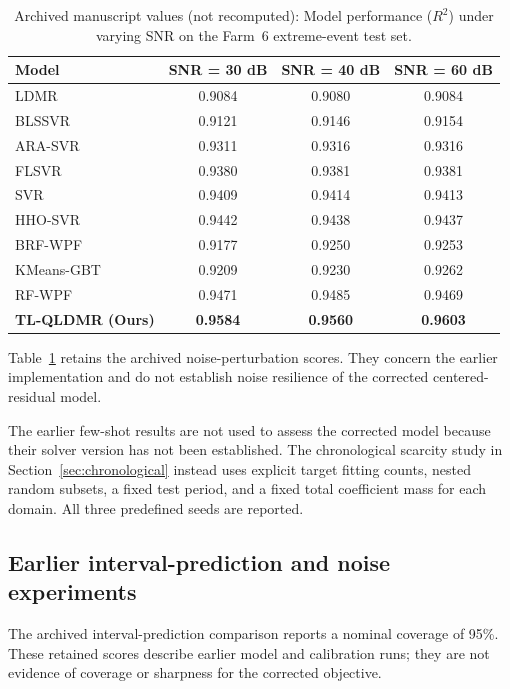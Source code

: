 \begin{table}[ht]
\centering
\caption{{\color{blue}Archived manuscript values (not recomputed): }Model performance ($R^2$) under varying SNR on the Farm~6 extreme-event test set.}
\setlength{\tabcolsep}{3.5mm}
\begin{tabular}{lccc}
\toprule
Model & SNR = 30 dB & SNR = 40 dB & SNR = 60 dB \\
\midrule
LDMR & 0.9084 & 0.9080 & 0.9084 \\
BLSSVR        & 0.9121 & 0.9146 & 0.9154 \\
ARA-SVR       & 0.9311 & 0.9316 & 0.9316 \\
FLSVR         & 0.9380 & 0.9381 & 0.9381 \\
SVR  & 0.9409 & 0.9414 & 0.9413 \\
HHO-SVR       & 0.9442 & 0.9438 & 0.9437 \\
BRF-WPF       & 0.9177 & 0.9250 & 0.9253 \\
KMeans-GBT    & 0.9209 & 0.9230 & 0.9262 \\
RF-WPF        & 0.9471 & 0.9485 & 0.9469 \\
\textbf{TL-QLDMR (Ours)} & \textbf{0.9584} & \textbf{0.9560} & \textbf{0.9603} \\
\bottomrule
\end{tabular}
\label{tab:exp2_noise}
\end{table}

{\color{blue}Table~\ref{tab:exp2_noise} retains the archived noise-perturbation scores. They concern the earlier implementation and do not establish noise resilience of the corrected centered-residual model.}

{\color{blue}The earlier few-shot results are not used to assess the corrected model because their solver version has not been established. The chronological scarcity study in Section~\ref{sec:chronological} instead uses explicit target fitting counts, nested random subsets, a fixed test period, and a fixed total coefficient mass for each domain. All three predefined seeds are reported.}

\subsection{Earlier interval-prediction and noise experiments}\label{sec:exp3}

{\color{blue}The archived interval-prediction comparison reports a nominal coverage of 95\%. These retained scores describe earlier model and calibration runs; they are not evidence of coverage or sharpness for the corrected objective.}


